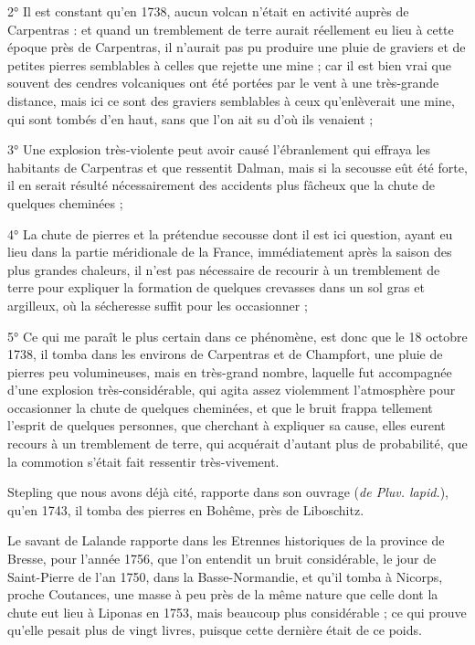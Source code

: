 \documentclass[a4paper, 12pt, oneside, french]{article}
\begin{document}
2° Il est constant qu'en 1738, aucun volcan n'était en activité auprès de Carpentras : et quand un tremblement de terre aurait réellement eu lieu à cette époque près de Carpentras, il n'aurait pas pu produire une pluie de graviers et de petites pierres semblables à celles que rejette une mine ; car il est bien vrai que souvent des cendres volcaniques ont été portées par le vent à une très-grande distance, mais ici ce sont des graviers semblables à ceux qu'enlèverait une mine, qui sont tombés d'en haut, sans que l'on ait su d'où ils venaient ;

3° Une explosion très-violente peut avoir causé l'ébranlement qui effraya les habitants de Carpentras et que ressentit Dalman, mais si la secousse eût été forte, il en serait résulté nécessairement des accidents plus fâcheux que la chute de quelques cheminées ;

4° La chute de pierres et la prétendue secousse dont il est ici question, ayant eu lieu dans la partie méridionale de la France, immédiatement après la saison des plus grandes chaleurs, il n'est pas nécessaire de recourir à un tremblement de terre pour expliquer la formation de quelques crevasses dans un sol gras et argilleux, où la sécheresse suffit pour les occasionner ;

5° Ce qui me paraît le plus certain dans ce phénomène, est donc que le 18 octobre 1738, il tomba dans les environs de Carpentras et de Champfort, une pluie de pierres peu volumineuses, mais en très-grand nombre, laquelle fut accompagnée d'une explosion très-considérable, qui agita assez violemment l'atmosphère pour occasionner la chute de quelques cheminées, et que le bruit frappa tellement l'esprit de quelques personnes, que cherchant à expliquer sa cause, elles eurent recours à un tremblement de terre, qui acquérait d'autant plus de probabilité, que la commotion s'était fait ressentir très-vivement.

Stepling que nous avons déjà cité, rapporte dans son ouvrage (\emph{de Pluv. lapid.}), qu'en 1743, il tomba des pierres en Bohême, près de Liboschitz.

Le savant de Lalande rapporte dans les Etrennes historiques de la province de Bresse, pour l'année 1756, que l'on entendit un bruit considérable, le jour de Saint-Pierre de l'an 1750, dans la Basse-Normandie, et qu'il tomba à Nicorps, proche Coutances, une masse à peu près de la même nature que celle dont la chute eut lieu à Liponas en 1753, mais beaucoup plus considérable ; ce qui prouve qu'elle pesait plus de vingt livres, puisque cette dernière était de ce poids.
\end{document}
